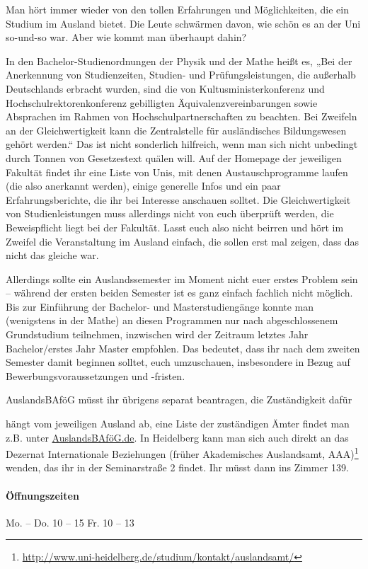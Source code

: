 \newpage{}%
Man hört immer wieder von den tollen Erfahrungen und Möglichkeiten, die ein
Studium im Ausland bietet. Die Leute schwärmen davon, wie schön es an der Uni
so-und-so war. Aber wie kommt man überhaupt dahin?

In den Bachelor-Studienordnungen der Physik und der Mathe heißt es, „Bei der
Anerkennung von Studienzeiten, Studien- und Prüfungsleistungen, die außerhalb
Deutschlands erbracht wurden, sind die von Kultusministerkonferenz und
Hochschulrektorenkonferenz gebilligten Äquivalenzvereinbarungen sowie
Absprachen im Rahmen von Hochschulpartnerschaften zu beachten. Bei Zweifeln an
der Gleichwertigkeit kann die Zentralstelle für ausländisches Bildungswesen
gehört werden.“ Das ist nicht sonderlich hilfreich, wenn man sich nicht
unbedingt durch Tonnen von Gesetzestext quälen will. Auf der Homepage der
jeweiligen Fakultät findet ihr eine Liste von Unis, mit denen
Austauschprogramme laufen (die also anerkannt werden), einige generelle Infos
und ein paar Erfahrungsberichte, die ihr bei Interesse anschauen solltet.
Die Gleichwertigkeit von Studienleistungen muss allerdings nicht von euch 
überprüft werden, die Beweispflicht liegt bei der Fakultät. Lasst euch also 
nicht beirren und hört im Zweifel die Veranstaltung im Ausland einfach, die
sollen erst mal zeigen, dass das nicht das gleiche war.

Allerdings sollte ein Auslandssemester im Moment nicht euer erstes Problem
sein -- während der ersten beiden Semester ist es ganz einfach fachlich nicht
möglich. Bis zur Einführung der Bachelor- und Masterstudiengänge konnte man
(wenigstens in der Mathe) an diesen Programmen nur nach abgeschlossenem
Grundstudium teilnehmen, inzwischen wird der Zeitraum letztes Jahr
Bachelor/erstes Jahr Master empfohlen. Das bedeutet, dass ihr nach dem zweiten
Semester damit beginnen solltet, euch umzuschauen, insbesondere in Bezug auf
Bewerbungsvoraussetzungen und -fristen.

AuslandsBAföG müsst ihr übrigens separat beantragen, die Zuständigkeit dafür

hängt vom jeweiligen Ausland ab, eine Liste der zuständigen Ämter findet man
z.B. unter \url{AuslandsBAföG.de}. In Heidelberg kann man sich auch direkt
an das Dezernat Internationale Beziehungen (früher Akademisches Auslandsamt, AAA)\footnote{\url{http://www.uni-heidelberg.de/studium/kontakt/auslandsamt/}} wenden, das ihr in der Seminarstraße 2 findet. Ihr müsst dann ins Zimmer 139.

\paragraph{Öffnungszeiten} Mo. -- Do. 10 -- 15 \qquad Fr. 10 -- 13

